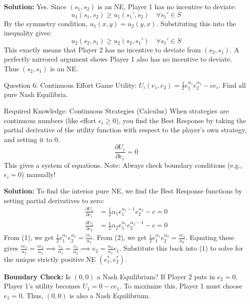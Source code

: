 \documentclass[12pt, a4paper]{article}
\begin{document}
\textbf{Solution:} Yes. Since $(s_1, s_2)$ is an NE, Player 1 has no incentive to deviate: 
\[ u_1(s_1, s_2) \geq u_1(s_1', s_2) \quad \forall s_1' \in S \]
By the symmetry condition, $u_1(x,y) = u_2(y,x)$. Substituting this into the inequality gives:
\[ u_2(s_2, s_1) \geq u_2(s_2, s_1') \quad \forall s_1' \in S \]
This exactly means that Player 2 has no incentive to deviate from $(s_2, s_1)$. A perfectly mirrored argument shows Player 1 also has no incentive to deviate. Thus $(s_2, s_1)$ is an NE.

\vspace{0.5cm}
\begin{exbox}{Question 6: Continuous Effort Game}
Utility: $U_i(e_1, e_2) = \frac{1}{2} e_1^{\alpha_1} e_2^{\alpha_2} - c e_i$. Find all pure Nash Equilibria.
\end{exbox}

\begin{defbox}{Required Knowledge: Continuous Strategies (Calculus)}
When strategies are continuous numbers (like effort $e_i \geq 0$), you find the Best Response by taking the partial derivative of the utility function with respect to the player's own strategy, and setting it to 0. 
\[ \frac{\partial U_i}{\partial e_i} = 0 \]
This gives a system of equations. Note: Always check boundary conditions (e.g., $e_i = 0$) manually!
\end{defbox}

\textbf{Solution:} 
To find the interior pure NE, we find the Best Response functions by setting partial derivatives to zero:
\begin{align}
\frac{\partial U_1}{\partial e_1} &= \frac{1}{2}\alpha_1 e_1^{\alpha_1 - 1} e_2^{\alpha_2} - c = 0 \\
\frac{\partial U_2}{\partial e_2} &= \frac{1}{2}\alpha_2 e_1^{\alpha_1} e_2^{\alpha_2 - 1} - c = 0 
\end{align}
From (1), we get $\frac{1}{2} e_1^{\alpha_1} e_2^{\alpha_2} = \frac{c e_1}{\alpha_1}$. From (2), we get $\frac{1}{2} e_1^{\alpha_1} e_2^{\alpha_2} = \frac{c e_2}{\alpha_2}$.
Equating these gives $\frac{c e_1}{\alpha_1} = \frac{c e_2}{\alpha_2} \implies \frac{e_1}{\alpha_1} = \frac{e_2}{\alpha_2} \implies e_2 = \frac{\alpha_2}{\alpha_1} e_1$.
Substitute this back into (1) to solve for the unique strictly positive NE $(e_1^*, e_2^*)$.

\textbf{Boundary Check:} Is $(0,0)$ a Nash Equilibrium? If Player 2 puts in $e_2 = 0$, Player 1's utility becomes $U_1 = 0 - c e_1$. To maximize this, Player 1 must choose $e_1 = 0$. Thus, $(0,0)$ is also a Nash Equilibrium.
\end{document}
